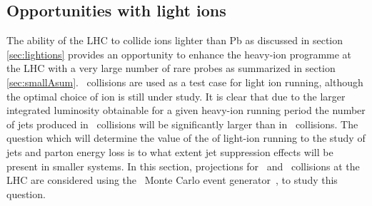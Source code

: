 \subsection{Opportunities with light ions}
\label{sec:jetslightions}

The ability of the LHC to collide ions lighter than Pb as discussed in section \ref{sec:lightions} provides an opportunity to enhance the heavy-ion programme at the LHC with a very large number of rare probes as summarized in section \ref{sec:smallAsum}.  \ArAr\ collisions are used as a test case for light ion running, although the optimal choice of ion is still under study. It is clear that due to the larger integrated luminosity obtainable for a given heavy-ion running period the number of jets produced in \ArAr\ collisions will be significantly larger than in \PbPb\ collisions.  The question which will determine the value of the of light-ion running to the study of jets and parton energy loss is to what extent jet suppression effects will be present in smaller systems.  In this section, projections for \ArAr\ and \XeXe\ collisions at the LHC are considered using the \jewel\ Monte Carlo event generator~\cite{Zapp:2013vla}, to study this question.  

